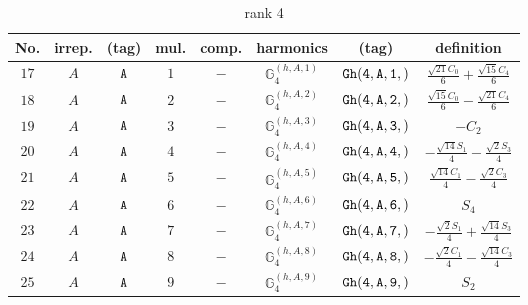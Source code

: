 \documentclass[fleqn,8pt]{jsarticle}
\begin{document}
\begin{table}[ht!]
\begin{center}
\caption{rank 4}
\renewcommand{\arraystretch}{1.3}
\begin{tabular}{cccccccc} \hline \hline
No. & irrep. & (tag) & mul. & comp. & harmonics & (tag) & definition \\ \hline
$ 17 $ & $ A $ & $ {\tt A} $ & $ 1 $ & $ - $ & $ \mathbb{G}_{4}^{(h,A,1)} $ & $ {\tt Gh(4,A,1,)} $ & $ \frac{\sqrt{21} C_{0}}{6} + \frac{\sqrt{15} C_{4}}{6} $ \\
$ 18 $ & $ A $ & $ {\tt A} $ & $ 2 $ & $ - $ & $ \mathbb{G}_{4}^{(h,A,2)} $ & $ {\tt Gh(4,A,2,)} $ & $ \frac{\sqrt{15} C_{0}}{6} - \frac{\sqrt{21} C_{4}}{6} $ \\
$ 19 $ & $ A $ & $ {\tt A} $ & $ 3 $ & $ - $ & $ \mathbb{G}_{4}^{(h,A,3)} $ & $ {\tt Gh(4,A,3,)} $ & $ - C_{2} $ \\
$ 20 $ & $ A $ & $ {\tt A} $ & $ 4 $ & $ - $ & $ \mathbb{G}_{4}^{(h,A,4)} $ & $ {\tt Gh(4,A,4,)} $ & $ - \frac{\sqrt{14} S_{1}}{4} - \frac{\sqrt{2} S_{3}}{4} $ \\
$ 21 $ & $ A $ & $ {\tt A} $ & $ 5 $ & $ - $ & $ \mathbb{G}_{4}^{(h,A,5)} $ & $ {\tt Gh(4,A,5,)} $ & $ \frac{\sqrt{14} C_{1}}{4} - \frac{\sqrt{2} C_{3}}{4} $ \\
$ 22 $ & $ A $ & $ {\tt A} $ & $ 6 $ & $ - $ & $ \mathbb{G}_{4}^{(h,A,6)} $ & $ {\tt Gh(4,A,6,)} $ & $ S_{4} $ \\
$ 23 $ & $ A $ & $ {\tt A} $ & $ 7 $ & $ - $ & $ \mathbb{G}_{4}^{(h,A,7)} $ & $ {\tt Gh(4,A,7,)} $ & $ - \frac{\sqrt{2} S_{1}}{4} + \frac{\sqrt{14} S_{3}}{4} $ \\
$ 24 $ & $ A $ & $ {\tt A} $ & $ 8 $ & $ - $ & $ \mathbb{G}_{4}^{(h,A,8)} $ & $ {\tt Gh(4,A,8,)} $ & $ - \frac{\sqrt{2} C_{1}}{4} - \frac{\sqrt{14} C_{3}}{4} $ \\
$ 25 $ & $ A $ & $ {\tt A} $ & $ 9 $ & $ - $ & $ \mathbb{G}_{4}^{(h,A,9)} $ & $ {\tt Gh(4,A,9,)} $ & $ S_{2} $ \\
 \hline \hline
\end{tabular}
\end{center}
\end{table}
\end{document}
